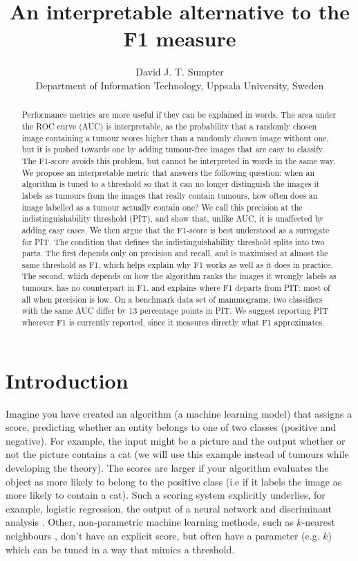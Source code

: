 \documentclass[preprint,12pt]{article}
\title{An interpretable alternative to the F1 measure}
\author{David J. T. Sumpter \\ Department of Information Technology, Uppsala University, Sweden}
\begin{document}

\maketitle

\begin{abstract}
Performance metrics are more useful if they can be explained in words. The area under the ROC curve (AUC) is interpretable, as the probability that a randomly chosen image containing a tumour scores higher than a randomly chosen image without one, but it is pushed towards one by adding tumour-free images that are easy to classify. The F1-score avoids this problem, but cannot be interpreted in words in the same way. We propose an interpretable metric that answers the following question: when an algorithm is tuned to a threshold so that it can no longer distinguish the images it labels as tumours from the images that really contain tumours, how often does an image labelled as a tumour actually contain one? We call this precision at the indistinguishability threshold (PIT), and show that, unlike AUC, it is unaffected by adding easy cases. We then argue that the F1-score is best understood as a surrogate for PIT. The condition that defines the indistinguishability threshold splits into two parts. The first depends only on precision and recall, and is maximised at almost the same threshold as F1, which helps explain why F1 works as well as it does in practice. The second, which depends on how the algorithm ranks the images it wrongly labels as tumours, has no counterpart in F1, and explains where F1 departs from PIT: most of all when precision is low. On a benchmark data set of mammograms, two classifiers with the same AUC differ by 13 percentage points in PIT. We suggest reporting PIT wherever F1 is currently reported, since it measures directly what F1 approximates.
\end{abstract}

\section*{Introduction}

Imagine you have created an algorithm (a machine learning model) that assigns a score, predicting whether an entity belongs to one of two classes (positive and negative). For example, the input might be a picture and the output whether or not the picture contains a cat (we will use this example instead of tumours while developing the theory). The scores are larger if your algorithm evaluates the object as more likely to belong to the positive class (i.e if it labels the image as more likely to contain a cat). Such a scoring system explicitly underlies, for example, logistic regression, the output of a neural network and discriminant analysis \cite{smlbook}. Other, non-parametric machine learning methods, such as $k$-nearest neighbours \cite{fix1989discriminatory}, don't have an explicit score, but often have a parameter (e.g. $k$) which can be tuned in a way that mimics a threshold. 
\end{document}
